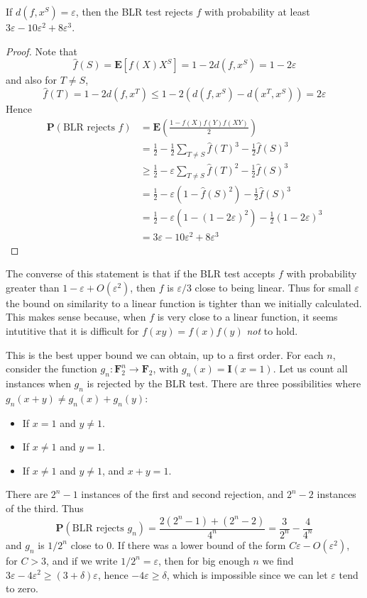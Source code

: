 \begin{theorem}
    If $d(f,x^S) = \varepsilon$, then the BLR test rejects $f$ with probability at least $3\varepsilon - 10 \varepsilon^2 + 8 \varepsilon^3$.
\end{theorem}
\begin{proof}
    Note that
    \[ \widehat{f}(S) = \mathbf{E}[f(X)X^S] = 1 - 2d(f,x^S) = 1 - 2\varepsilon \]
    and also for $T \neq S$,
    \[ \widehat{f}(T) = 1 - 2d(f,x^T) \leq 1 - 2(d(f,x^S) - d(x^T,x^S)) = 2 \varepsilon \]
    Hence
    \begin{align*}
        \mathbf{P}(\text{BLR rejects $f$}) &= \mathbf{E} \left( \frac{1 - f(X)f(Y)f(XY)}{2} \right)\\
        &= \frac{1}{2} - \frac{1}{2} \sum_{T \neq S} \widehat{f}(T)^3  - \frac{1}{2} \widehat{f}(S)^3\\
        &\geq \frac{1}{2}  - \varepsilon \sum_{T \neq S} \widehat{f}(T)^2 - \frac{1}{2} \widehat{f}(S)^3\\
        &= \frac{1}{2} - \varepsilon (1 - \widehat{f}(S)^2) - \frac{1}{2} \widehat{f}(S)^3\\
        &= \frac{1}{2} - \varepsilon (1 - (1 - 2 \varepsilon)^2) - \frac{1}{2} (1 - 2\varepsilon)^3\\
        &=  3\varepsilon - 10 \varepsilon^2 + 8 \varepsilon^3
    \end{align*}
\end{proof}

The converse of this statement is that if the BLR test accepts $f$ with probability greater than $1 - \varepsilon + O(\varepsilon^2)$, then $f$ is $\varepsilon/3$ close to being linear. Thus for small $\varepsilon$ the bound on similarity to a linear function is tighter than we initially calculated. This makes sense because, when $f$ is very close to a linear function, it seems intutitive that it is difficult for $f(xy) = f(x)f(y)$ {\it not} to hold.

This is the best upper bound we can obtain, up to a first order. For each $n$, consider the function $g_n: \mathbf{F}_2^n \to \mathbf{F}_2$, with $g_n(x) = \mathbf{I}(x = 1)$. Let us count all instances when $g_n$ is rejected by the BLR test. There are three possibilities where $g_n(x + y) \neq g_n(x) + g_n(y)$:
%
\begin{itemize}
    \item If $x = 1$ and $y \neq 1$.
    \item If $x \neq 1$ and $y = 1$.
    \item If $x \neq 1$ and $y \neq 1$, and $x + y = 1$.
\end{itemize}
%
There are $2^n - 1$ instances of the first and second rejection, and $2^n - 2$ instances of the third. Thus
%
\[ \mathbf{P}(\text{BLR rejects $g_n$}) = \frac{2(2^n - 1) + (2^n - 2)}{4^n} = \frac{3}{2^n} - \frac{4}{4^n} \]
%
and $g_n$ is $1/2^n$ close to $0$. If there was a lower bound of the form $C \varepsilon - O(\varepsilon^2)$, for $C > 3$, and if we write $1/2^n = \varepsilon$, then for big enough $n$ we find $3\varepsilon - 4\varepsilon^2 \geq (3 + \delta) \varepsilon$, hence $-4\varepsilon \geq \delta$, which is impossible since we can let $\varepsilon$ tend to zero.
 

